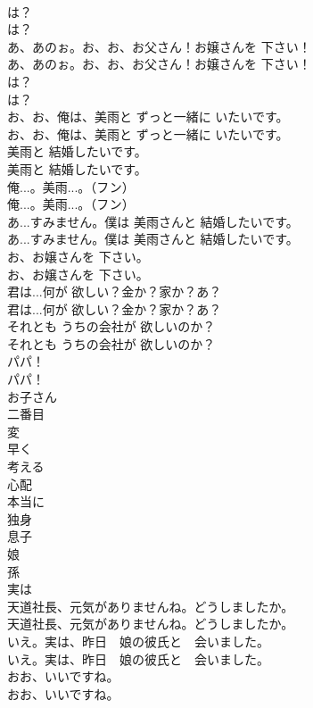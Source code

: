 \documentclass[8pt]{extreport}
\begin{document}
\begin{CJK}{UTF8}{min}
\\	は？	
\\	は？ 
\\	あ、あのぉ。お、お、お父さん！お嬢さんを 下さい！	
\\	あ、あのぉ。お、お、お父さん！お嬢さんを 下さい！ 
\\	は？	
\\	は？ 
\\	お、お、俺は、美雨と ずっと一緒に いたいです。	
\\	お、お、俺は、美雨と ずっと一緒に いたいです。 
\\	美雨と 結婚したいです。	
\\	美雨と 結婚したいです。 
\\	俺...。美雨...。（フン）	
\\	俺...。美雨...。（フン） 
\\	あ...すみません。僕は 美雨さんと 結婚したいです。	
\\	あ...すみません。僕は 美雨さんと 結婚したいです。 
\\	お、お嬢さんを 下さい。	
\\	お、お嬢さんを 下さい。 
\\	君は...何が 欲しい？金か？家か？あ？	
\\	君は...何が 欲しい？金か？家か？あ？ 
\\	それとも うちの会社が 欲しいのか？	
\\	それとも うちの会社が 欲しいのか？ 
\\	パパ！	
\\	パパ！ 
\\	お子さん
\\	二番目
\\	変
\\	早く
\\	考える
\\	心配
\\	本当に
\\	独身
\\	息子
\\	娘
\\	孫
\\	実は
\\	天道社長、元気がありませんね。どうしましたか。	
\\	天道社長、元気がありませんね。どうしましたか。 
\\	いえ。実は、昨日　娘の彼氏と　会いました。	
\\	いえ。実は、昨日　娘の彼氏と　会いました。 
\\	おお、いいですね。	
\\	おお、いいですね。 

\end{CJK}
\end{document}
